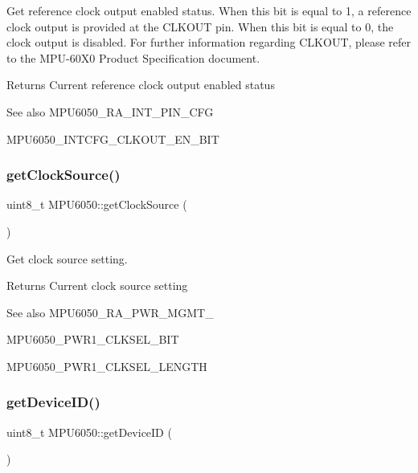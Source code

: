 Get reference clock output enabled status. When this bit is equal to 1, a reference clock output is provided at the C\+L\+K\+O\+UT pin. When this bit is equal to 0, the clock output is disabled. For further information regarding C\+L\+K\+O\+UT, please refer to the M\+P\+U-\/60\+X0 Product Specification document. \begin{DoxyReturn}{Returns}
Current reference clock output enabled status 
\end{DoxyReturn}
\begin{DoxySeeAlso}{See also}
M\+P\+U6050\+\_\+\+R\+A\+\_\+\+I\+N\+T\+\_\+\+P\+I\+N\+\_\+\+C\+FG 

M\+P\+U6050\+\_\+\+I\+N\+T\+C\+F\+G\+\_\+\+C\+L\+K\+O\+U\+T\+\_\+\+E\+N\+\_\+\+B\+IT 
\end{DoxySeeAlso}
\mbox{\label{class_m_p_u6050_a8ed670258a805807b5102cdc5d0996a8}} 
\subsubsection{\texorpdfstring{getClockSource()}{getClockSource()}}
{\footnotesize\ttfamily uint8\+\_\+t M\+P\+U6050\+::get\+Clock\+Source (\begin{DoxyParamCaption}{ }\end{DoxyParamCaption})}

Get clock source setting. \begin{DoxyReturn}{Returns}
Current clock source setting 
\end{DoxyReturn}
\begin{DoxySeeAlso}{See also}
M\+P\+U6050\+\_\+\+R\+A\+\_\+\+P\+W\+R\+\_\+\+M\+G\+M\+T\+\_ 

M\+P\+U6050\+\_\+\+P\+W\+R1\+\_\+\+C\+L\+K\+S\+E\+L\+\_\+\+B\+IT 

M\+P\+U6050\+\_\+\+P\+W\+R1\+\_\+\+C\+L\+K\+S\+E\+L\+\_\+\+L\+E\+N\+G\+TH 
\end{DoxySeeAlso}
\mbox{\label{class_m_p_u6050_a35ae3c8894b3258e642043886801e031}} 
\subsubsection{\texorpdfstring{getDeviceID()}{getDeviceID()}}
{\footnotesize\ttfamily uint8\+\_\+t M\+P\+U6050\+::get\+Device\+ID (\begin{DoxyParamCaption}{ }\end{DoxyParamCaption})}

